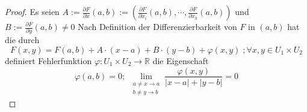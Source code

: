 	
%
	
%
\begin{proof}
	Es seien $ A := \frac{\partial F}{\partial x} (a,b) := \left( \frac{\partial F}{\partial x_i} (a,b) , \cdots,  \frac{\partial F}{\partial x_k} (a,b) \right)   $  und $ B := \frac{\partial F}{\partial y} (a,b) \neq 0 $ 
	Nach Definition der Differenzierbarkeit von $ F $ in $ (a,b) $ hat die durch 
	\begin{equation}
		F (x,y) = F (a,b) + A \cdot (x-a) + B \cdot (y-b) + \varphi (x,y) \; ; \forall x,y \in U_1 \times U_2
		\tag{1}
	\end{equation}
	definiert Fehlerfunktion $ \varphi : U_1 \times U_2 \to \mathbb{R}  $ die Eigenschaft 
	\begin{equation}
	\varphi (a,b) = 0 ; \; \lim_{ \substack{ a \neq x \to a \\ b \neq y \to b} } \frac{\varphi(x,y)}{ |x-a| + |y-b|} = 0  
	\tag{2}
\end{equation}


\end{proof}
